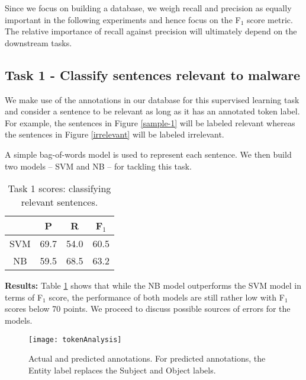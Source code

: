 \documentclass[11pt,a4paper]{article}
\begin{document}
Since we focus on building a database, we weigh recall and precision as equally important in the following experiments and hence focus on the F$_{1}$ score metric. 
The relative importance of recall against precision will ultimately depend on the downstream tasks.

\subsection{Task 1 - Classify sentences relevant to malware}

We make use of the annotations in our database for this supervised learning task and consider a sentence to be relevant as long as it has an annotated token label. For example, the sentences in Figure \ref{sample-1} will be labeled relevant whereas the sentences in Figure \ref{irrelevant} will be labeled irrelevant.

A simple bag-of-words model is used to represent each sentence. We then build two models -- SVM and NB -- for tackling this task.

\begin{table}[t]
\begin{center}
\small
{\def\arraystretch{1.125}\tabcolsep=3.5pt
\begin{tabular}{c | c | c | c}
\hline 
& \bf P & \bf R & \bf F$_{1}$ \\ 
\hline
SVM & 69.7 & 54.0 & 60.5 \\
NB & 59.5 & 68.5 & 63.2 \\
\hline
\end{tabular}
}
\end{center}
\caption{\label{t1_scores} Task 1 scores: classifying relevant sentences.}
\vspace{-1em}
\end{table}

\textbf{Results:} Table \ref{t1_scores} shows that while the NB model outperforms the SVM model in terms of F$_{1}$ score, the performance of both models are still rather low with F$_{1}$ scores below 70 points. We proceed to discuss possible sources of errors for the models.

\begin{figure*}[t]
\centering
\texttt{[image: tokenAnalysis]}
\vspace{-2mm}
\caption{\label{error-2}Actual and predicted annotations. For predicted annotations, the Entity label replaces the Subject and Object labels.}
\end{figure*}
\end{document}

